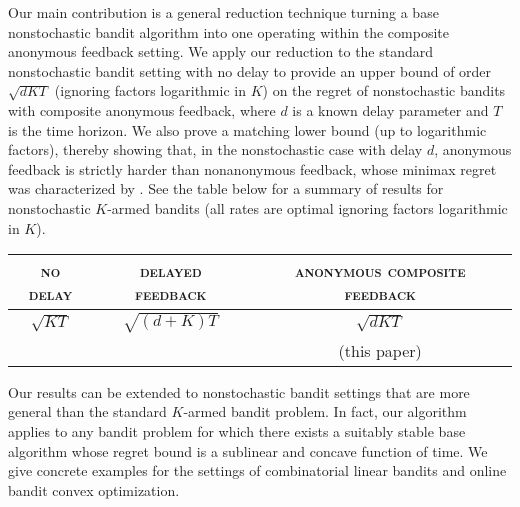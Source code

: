 Our main contribution is a general reduction technique turning a base nonstochastic bandit algorithm into one operating within the composite anonymous feedback setting. We apply our reduction to the standard nonstochastic bandit setting with no delay to provide an upper bound of order $\sqrt{dKT}$ (ignoring factors logarithmic in $K$) on the regret of nonstochastic bandits with composite anonymous feedback, where $d$ is a known delay parameter and $T$ is the time horizon. We also prove a matching lower bound (up to logarithmic factors), thereby showing that, in the nonstochastic case with delay $d$, anonymous feedback is strictly harder than nonanonymous feedback, whose minimax regret was characterized by \citet{cgmm16}. See the table below for a summary of results for nonstochastic $K$-armed bandits (all rates are optimal ignoring factors logarithmic in $K$).
%
\begin{center}
\begin{tabular}{|c|c|c|}
\hline
\textsc{no delay} & \textsc{delayed feedback} & \textsc{anonymous composite feedback}
\\ \hline\hline
\rule{0pt}{3ex} $\sqrt{KT}$ & $\sqrt{(d+K)T}$ & $\sqrt{dKT}$
\\
\citep{AuerCeFrSc02} & \citep{cgmm16} & (this paper)
\\ \hline
\end{tabular}
\end{center}
%
Our results can be extended to nonstochastic bandit settings that are more general than the standard $K$-armed bandit problem. In fact, our algorithm applies to any bandit problem for which there exists a suitably stable base algorithm whose regret bound is a sublinear and concave function of time. We give concrete examples %
for the settings of combinatorial linear bandits and online bandit convex optimization.

